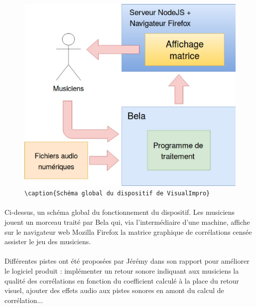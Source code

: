 \begin{figure}[h]
	\centering
	\includegraphics[scale=0.5]{schemaglobal.png}
	\verb!\caption{Schéma global du dispositif de VisualImpro}!
	\label{schéma global}
\end{figure}

\paragraph{}
Ci-dessus, un schéma global du fonctionnement du dispositif. Les
musiciens jouent un morceau traité par Bela qui, via l'intermédiaire
d'une machine, affiche sur le navigateur web Mozilla Firefox la
matrice graphique de corrélations censée assister le jeu des
musiciens.

\paragraph{}
Différentes pistes ont été proposées par Jérémy dans son rapport pour
améliorer le logiciel produit : implémenter un retour sonore indiquant
aux musiciens la qualité des corrélations en fonction du coefficient
calculé à la place du retour visuel, ajouter des effets audio aux
pistes sonores en amont du calcul de corrélation...
